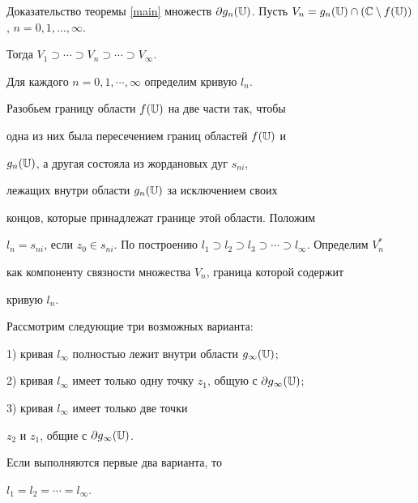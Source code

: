 \begin{pf*}{Доказательство теоремы \ref{main}}
множеств $\partial g_n(\Bbb U)$. Пусть $V_n=g_n(\Bbb


U)\cap(\Bbb C\setminus f(\Bbb U))$, $n=0,1,\dotsc, \infty$.


Тогда $V_1\supset\dotsb \supset V_n\supset\dotsb \supset


V_\infty$.





Для каждого $n=0,1,\dotsb, \infty$ определим кривую $l_n$.


Разобьем границу области $f(\Bbb U)$ на две части так, чтобы


одна из них была пересечением границ областей $f(\Bbb U)$ и


$g_n(\Bbb U)$, а другая состояла из жордановых дуг $s_{ni}$,


лежащих внутри области $g_n(\Bbb U)$ за исключением своих


концов, которые принадлежат границе этой области. Положим


$l_n=s_{ni}$, если $z_0\in s_{ni}$. По построению $l_1\supset


l_2\supset l_3\supset\dotsb \supset l_\infty$. Определим $V^*_n$


как компоненту связности множества $V_n$, граница которой содержит


кривую $l_n$.





Рассмотрим следующие три возможных варианта:





1) кривая $l_\infty$ полностью лежит внутри области $g_\infty(\Bbb U)$;





2) кривая $l_\infty$ имеет только одну точку $z_1$, общую с $\partial


g_\infty(\Bbb{U})$;





3) кривая $l_\infty$ имеет только две точки


$z_2$ и $z_1$, общие с $\partial g_\infty(\Bbb{U})$.





Если выполняются первые два варианта, то


$l_1=l_2=\dotsb=l_\infty$.






\end{pf*}
